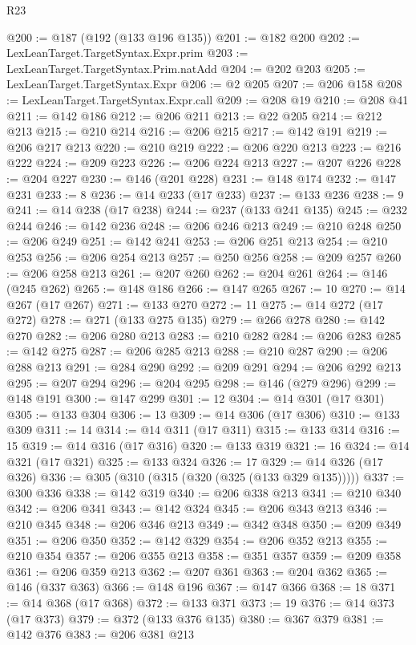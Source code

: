 \begin{lexlean}{R23}
\begin{coremodule}
@200 := @187 (@192 (@133 @196 @135))
@201 := @182 @200
@202 := LexLeanTarget.TargetSyntax.Expr.prim
@203 := LexLeanTarget.TargetSyntax.Prim.natAdd
@204 := @202 @203
@205 := LexLeanTarget.TargetSyntax.Expr
@206 := @2 @205
@207 := @206 @158
@208 := LexLeanTarget.TargetSyntax.Expr.call
@209 := @208 @19
@210 := @208 @41
@211 := @142 @186
@212 := @206 @211
@213 := @22 @205
@214 := @212 @213
@215 := @210 @214
@216 := @206 @215
@217 := @142 @191
@219 := @206 @217 @213
@220 := @210 @219
@222 := @206 @220 @213
@223 := @216 @222
@224 := @209 @223
@226 := @206 @224 @213
@227 := @207 @226
@228 := @204 @227
@230 := @146 (@201 @228)
@231 := @148 @174
@232 := @147 @231
@233 := 8
@236 := @14 @233 (@17 @233)
@237 := @133 @236
@238 := 9
@241 := @14 @238 (@17 @238)
@244 := @237 (@133 @241 @135)
@245 := @232 @244
@246 := @142 @236
@248 := @206 @246 @213
@249 := @210 @248
@250 := @206 @249
@251 := @142 @241
@253 := @206 @251 @213
@254 := @210 @253
@256 := @206 @254 @213
@257 := @250 @256
@258 := @209 @257
@260 := @206 @258 @213
@261 := @207 @260
@262 := @204 @261
@264 := @146 (@245 @262)
@265 := @148 @186
@266 := @147 @265
@267 := 10
@270 := @14 @267 (@17 @267)
@271 := @133 @270
@272 := 11
@275 := @14 @272 (@17 @272)
@278 := @271 (@133 @275 @135)
@279 := @266 @278
@280 := @142 @270
@282 := @206 @280 @213
@283 := @210 @282
@284 := @206 @283
@285 := @142 @275
@287 := @206 @285 @213
@288 := @210 @287
@290 := @206 @288 @213
@291 := @284 @290
@292 := @209 @291
@294 := @206 @292 @213
@295 := @207 @294
@296 := @204 @295
@298 := @146 (@279 @296)
@299 := @148 @191
@300 := @147 @299
@301 := 12
@304 := @14 @301 (@17 @301)
@305 := @133 @304
@306 := 13
@309 := @14 @306 (@17 @306)
@310 := @133 @309
@311 := 14
@314 := @14 @311 (@17 @311)
@315 := @133 @314
@316 := 15
@319 := @14 @316 (@17 @316)
@320 := @133 @319
@321 := 16
@324 := @14 @321 (@17 @321)
@325 := @133 @324
@326 := 17
@329 := @14 @326 (@17 @326)
@336 := @305 (@310 (@315 (@320 (@325 (@133 @329 @135)))))
@337 := @300 @336
@338 := @142 @319
@340 := @206 @338 @213
@341 := @210 @340
@342 := @206 @341
@343 := @142 @324
@345 := @206 @343 @213
@346 := @210 @345
@348 := @206 @346 @213
@349 := @342 @348
@350 := @209 @349
@351 := @206 @350
@352 := @142 @329
@354 := @206 @352 @213
@355 := @210 @354
@357 := @206 @355 @213
@358 := @351 @357
@359 := @209 @358
@361 := @206 @359 @213
@362 := @207 @361
@363 := @204 @362
@365 := @146 (@337 @363)
@366 := @148 @196
@367 := @147 @366
@368 := 18
@371 := @14 @368 (@17 @368)
@372 := @133 @371
@373 := 19
@376 := @14 @373 (@17 @373)
@379 := @372 (@133 @376 @135)
@380 := @367 @379
@381 := @142 @376
@383 := @206 @381 @213

\end{coremodule}
\end{lexlean}
